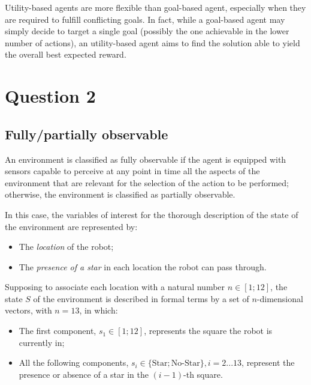 \documentclass[letterpaper,headings=standardclasses]{scrartcl}
\begin{document}
Utility-based agents are more flexible than goal-based agent, especially when they are required to fulfill conflicting goals. In fact, while a goal-based agent may simply decide to target a single goal (possibly the one achievable in the lower number of actions), an utility-based agent aims to find the solution able to yield the overall best expected reward.

\section{Question 2}

\subsection{Fully/partially observable}

An environment is classified as fully observable if the agent is equipped with sensors capable to perceive at any point in time all the aspects of the environment that are relevant for the selection of the action to be performed; otherwise, the environment is classified as partially observable.

In this case, the variables of interest for the thorough description of the state of the environment are represented by:

\begin{itemize}

\item The \emph{location} of the robot;
\item The \emph{presence of a star} in each location the robot can pass through.

\end{itemize}

Supposing to associate each location with a natural number $n \in [1; 12]$, the state $S$ of the environment is described in formal terms by a set of $n$-dimensional vectors, with $n = 13$, in which:

\begin{itemize}

\item The first component, $s_1 \in [1;12]$, represents the square the robot is currently in;
\item All the following components, $s_i \in \{\text{Star}; \text{No-Star}\}, i = 2 ... 13$, represent the presence or absence of a star in the $(i-1)$-th square.

\end{itemize}
\end{document}
